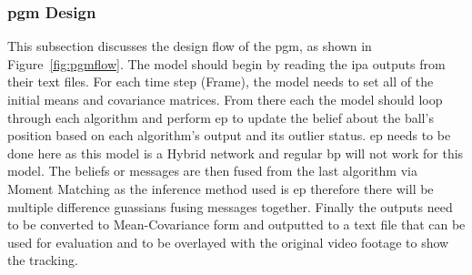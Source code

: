 \documentclass[12pt,a4paper]{article}
\begin{document}
 \subsubsection{\acs{pgm} Design}
This subsection discusses the design flow of the \acs{pgm}, as shown in Figure~\ref{fig:pgmflow}. The model should begin by reading the \acs{ipa} outputs from their text files. For each time step (Frame), the model needs to set all of the initial means and covariance matrices. From there each the model should loop through each algorithm and perform \acs{ep} to update the belief about the ball's position based on each algorithm's output and its outlier status. \acs{ep} needs to be done here as this model is a Hybrid network and regular \acs{bp} will not work for this model. The beliefs or messages are then fused from the last algorithm via Moment Matching as the inference method used is \acs{ep} therefore there will be multiple difference guassians fusing messages together. Finally the outputs need to be converted to Mean-Covariance form and outputted to a text file that can be used for evaluation and to be overlayed with the original video footage to show the tracking.
 
\end{document}
